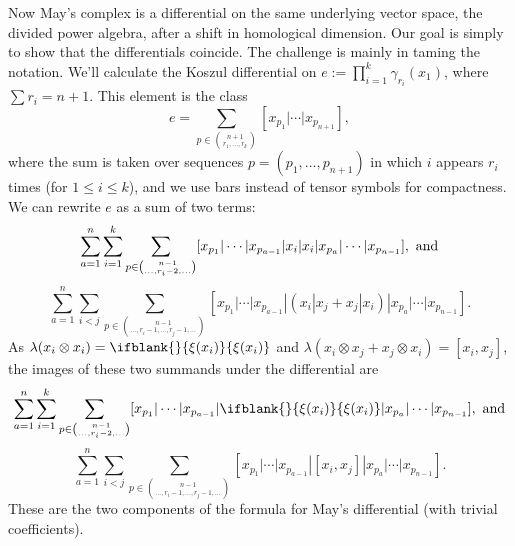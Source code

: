 \documentclass[10pt]{article}
\newcommand{\restn}[2][]{\ifblank{#1}{\xi{#2}}{\xi_{#1}{#2}}}%
\begin{document}
\begin{PRlieKoszulComplexCalculation}
Now May's complex is a differential on the same underlying vector space, the divided power algebra, after a shift in homological dimension. Our goal is simply to show that the differentials coincide. The challenge is mainly in taming the notation. We'll calculate the Koszul differential on $e:=\prod_{i=1}^k\gamma_{r_i}(x_1)$, where $\sum r_i=n+1$. This element is the class
\[e=\sum_{p\in{n+1\choose r_1,\ldots,r_k}}[x_{p_1}|\cdots| x_{p_{n+1}}],\]
where the sum is taken over sequences $p=(p_1,\ldots,p_{n+1})$ in which $i$ appears $r_i$ times (for $1\leq i\leq k$), and we use bars instead of tensor symbols for compactness. We can rewrite $e$ as a sum of two terms:
\[\sum_{a=1}^n\sum_{i=1}^k\sum_{p\in{n-1\choose \ldots,r_i-2,\ldots}}[x_{p_1}|\cdots | x_{p_{a-1}}| x_i| x_i| x_{p_{a}}|  \cdots| x_{p_{n-1}}], \textup{ and}\]
\[\sum_{a=1}^n\sum_{i<j}\sum_{p\in{n-1\choose \ldots,r_i-1,\ldots,r_j-1,\ldots}}[x_{p_1}|\cdots | x_{p_{a-1}}| (x_i| x_j+x_j| x_i)| x_{p_{a}}|  \cdots| x_{p_{n-1}}].\]
As $\lambda(x_i\otimes x_i)=\restn{(x_i)}$ and $\lambda(x_i\otimes x_j+x_j\otimes x_i)=[x_i,x_j]$, the images of these two summands under the differential are
\[\sum_{a=1}^n\sum_{i=1}^k\sum_{p\in{n-1\choose \ldots,r_i-2,\ldots}}[x_{p_1}|\cdots | x_{p_{a-1}}| \restn{(x_i)}| x_{p_{a}}|  \cdots| x_{p_{n-1}}], \textup{ and}\]
\[\sum_{a=1}^n\sum_{i<j}\sum_{p\in{n-1\choose \ldots,r_i-1,\ldots,r_j-1,\ldots}}[x_{p_1}|\cdots | x_{p_{a-1}}| [x_i,x_j]| x_{p_{a}}|  \cdots| x_{p_{n-1}}].\]
These are the two components of the formula for May's differential (with trivial coefficients).
\end{PRlieKoszulComplexCalculation}
\end{document}
